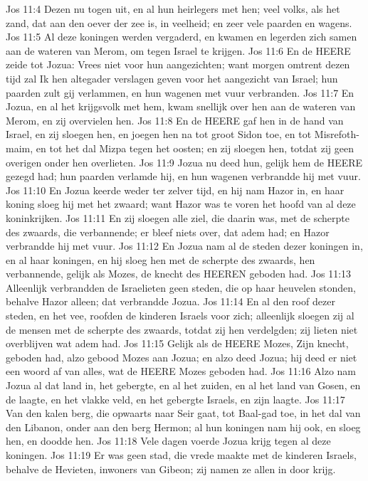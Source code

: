 Jos 11:4  Dezen nu togen uit, en al hun heirlegers met hen; veel volks, als het zand, dat aan den oever der zee is, in veelheid; en zeer vele paarden en wagens.
Jos 11:5  Al deze koningen werden vergaderd, en kwamen en legerden zich samen aan de wateren van Merom, om tegen Israel te krijgen.
Jos 11:6  En de HEERE zeide tot Jozua: Vrees niet voor hun aangezichten; want morgen omtrent dezen tijd zal Ik hen altegader verslagen geven voor het aangezicht van Israel; hun paarden zult gij verlammen, en hun wagenen met vuur verbranden.
Jos 11:7  En Jozua, en al het krijgsvolk met hem, kwam snellijk over hen aan de wateren van Merom, en zij overvielen hen.
Jos 11:8  En de HEERE gaf hen in de hand van Israel, en zij sloegen hen, en joegen hen na tot groot Sidon toe, en tot Misrefoth-maim, en tot het dal Mizpa tegen het oosten; en zij sloegen hen, totdat zij geen overigen onder hen overlieten.
Jos 11:9  Jozua nu deed hun, gelijk hem de HEERE gezegd had; hun paarden verlamde hij, en hun wagenen verbrandde hij met vuur.
Jos 11:10  En Jozua keerde weder ter zelver tijd, en hij nam Hazor in, en haar koning sloeg hij met het zwaard; want Hazor was te voren het hoofd van al deze koninkrijken.
Jos 11:11  En zij sloegen alle ziel, die daarin was, met de scherpte des zwaards, die verbannende; er bleef niets over, dat adem had; en Hazor verbrandde hij met vuur.
Jos 11:12  En Jozua nam al de steden dezer koningen in, en al haar koningen, en hij sloeg hen met de scherpte des zwaards, hen verbannende, gelijk als Mozes, de knecht des HEEREN geboden had.
Jos 11:13  Alleenlijk verbrandden de Israelieten geen steden, die op haar heuvelen stonden, behalve Hazor alleen; dat verbrandde Jozua.
Jos 11:14  En al den roof dezer steden, en het vee, roofden de kinderen Israels voor zich; alleenlijk sloegen zij al de mensen met de scherpte des zwaards, totdat zij hen verdelgden; zij lieten niet overblijven wat adem had.
Jos 11:15  Gelijk als de HEERE Mozes, Zijn knecht, geboden had, alzo gebood Mozes aan Jozua; en alzo deed Jozua; hij deed er niet een woord af van alles, wat de HEERE Mozes geboden had.
Jos 11:16  Alzo nam Jozua al dat land in, het gebergte, en al het zuiden, en al het land van Gosen, en de laagte, en het vlakke veld, en het gebergte Israels, en zijn laagte.
Jos 11:17  Van den kalen berg, die opwaarts naar Seir gaat, tot Baal-gad toe, in het dal van den Libanon, onder aan den berg Hermon; al hun koningen nam hij ook, en sloeg hen, en doodde hen.
Jos 11:18  Vele dagen voerde Jozua krijg tegen al deze koningen.
Jos 11:19  Er was geen stad, die vrede maakte met de kinderen Israels, behalve de Hevieten, inwoners van Gibeon; zij namen ze allen in door krijg.
